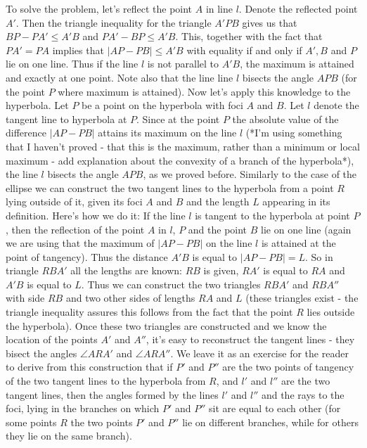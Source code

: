 To solve the problem, let's reflect the point $A$ in line $l$. Denote the reflected point $A'$. Then the triangle inequality for the triangle $A'PB$ gives us that $BP-PA'\leq A'B$ and $PA'-BP\leq A'B$. This, together with the fact that $PA'=PA$ implies that $|AP-PB|\leq A'B$ with equality if and only if $A',B$ and $P$ lie on one line. Thus if the line $l$ is not parallel to $A'B$, the maximum is attained and exactly at one point. Note also that the line line $l$ bisects the angle $APB$ (for the point $P$ where maximum is attained).
Now let's apply this knowledge to the hyperbola. Let $P$ be a point on the hyperbola with foci $A$ and $B$. Let $l$ denote the tangent line to hyperbola at $P$. Since at the point $P$ the absolute value of the difference $|AP-PB|$ attains its maximum on the line $l$ (*I'm using something that I haven't proved - that this is the maximum, rather than a minimum or local maximum - add explanation about the convexity of a branch of the hyperbola*), the line $l$ bisects the angle $APB$, as we proved before.
Similarly to the case of the ellipse we can construct the two tangent lines to the hyperbola from a point $R$ lying outside of it, given its foci $A$ and $B$ and the length $L$ appearing in its definition. Here's how we do it:
If the line $l$ is tangent to the hyperbola at point $P$, then the reflection of the point $A$ in $l$, $P$ and the point $B$ lie on one line (again we are using that the maximum of $|AP-PB|$ on the line $l$ is attained at the point of tangency). Thus the distance $A'B$ is equal to $|AP-PB|=L$. So in triangle $RBA'$ all the lengths are known: $RB$ is given, $RA'$ is equal to $RA$ and $A'B$ is equal to $L$. Thus we can construct the two triangles $RBA'$ and $RBA''$ with side $RB$ and two other sides of lengths $RA$ and $L$ (these triangles exist - the triangle inequality assures this follows from the fact that the point $R$ lies outside the hyperbola). Once these two triangles are constructed and we know the location of the points $A'$ and $A''$, it's easy to reconstruct the tangent lines - they bisect the angles $\angle ARA'$ and $\angle ARA''$.
We leave it as an exercise for the reader to derive from this construction that if $P'$ and $P''$ are the two points of tangency of the two tangent lines to the hyperbola from $R$, and $l'$ and $l''$ are the two tangent lines, then the angles formed by the lines $l'$ and $l''$ and the rays to the foci, lying in the branches on which $P'$ and $P''$ sit are equal to each other (for some points $R$ the two points $P'$ and $P''$ lie on different branches, while for others they lie on the same branch).
